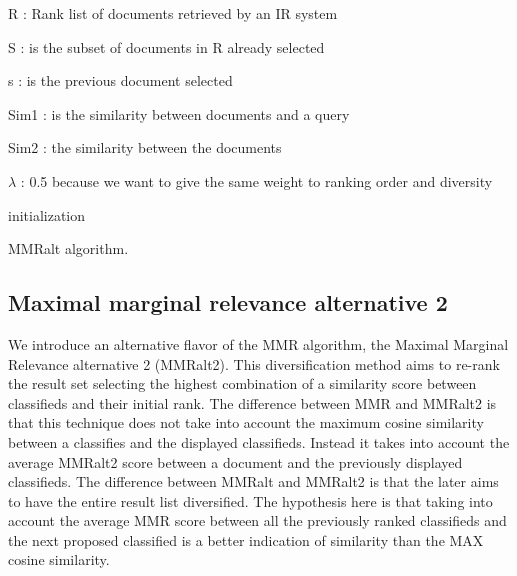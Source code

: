 R : Rank list of documents retrieved by an IR system

S : is the subset of documents in R already selected

s : is the previous document selected

Sim1 : is the similarity between documents and a query

Sim2 : the similarity between the documents

$\lambda$ : 0.5 because we want to give the same weight to ranking order and diversity






\bigskip

\begin{algorithm}[H]
 initialization\;
 \caption{MMRalt algorithm.}
\end{algorithm}

\subsection{Maximal marginal relevance alternative 2}

We introduce an alternative flavor of the MMR algorithm, the Maximal Marginal Relevance alternative 2 (MMRalt2). This diversification method aims to re-rank the result set selecting the highest combination of a similarity score between classifieds and their initial rank. The difference between MMR and MMRalt2 is that this technique does not take into account the maximum cosine similarity between a classifies and the displayed classifieds. Instead it takes into account the average MMRalt2 score between a document and the previously displayed classifieds. The difference between MMRalt and MMRalt2 is that the later aims to have the entire result list diversified. The hypothesis here is that taking into account the average MMR score between all the previously ranked classifieds and the next proposed classified is a better indication of similarity than the MAX cosine similarity. 
\bigskip

